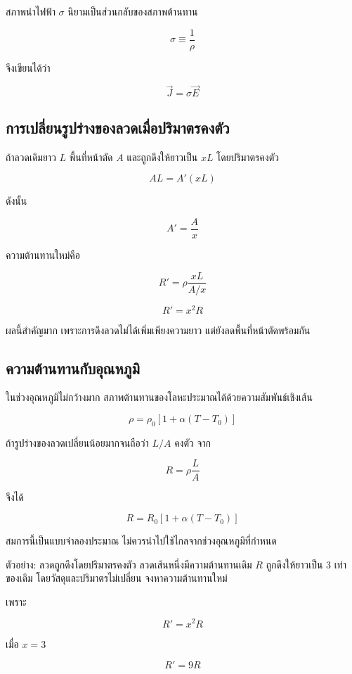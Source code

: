 สภาพนำไฟฟ้า $\sigma$ นิยามเป็นส่วนกลับของสภาพต้านทาน

\[
\boxed{\sigma\equiv\frac{1}{\rho}}
\]

จึงเขียนได้ว่า

\[
\vec{J}=\sigma\vec{E}
\]

\subsection{การเปลี่ยนรูปร่างของลวดเมื่อปริมาตรคงตัว}

ถ้าลวดเดิมยาว $L$ พื้นที่หน้าตัด $A$ และถูกดึงให้ยาวเป็น $xL$ โดยปริมาตรคงตัว

\[
AL=A'(xL)
\]

ดังนั้น

\[
A'=\frac{A}{x}
\]

ความต้านทานใหม่คือ

\[
R'=\rho\frac{xL}{A/x}
\]

\[
\boxed{R'=x^2R}
\]

ผลนี้สำคัญมาก เพราะการดึงลวดไม่ได้เพิ่มเพียงความยาว แต่ยังลดพื้นที่หน้าตัดพร้อมกัน

\subsection{ความต้านทานกับอุณหภูมิ}

ในช่วงอุณหภูมิไม่กว้างมาก สภาพต้านทานของโลหะประมาณได้ด้วยความสัมพันธ์เชิงเส้น

\[
\rho=\rho_0\left[1+\alpha(T-T_0)\right]
\]

ถ้ารูปร่างของลวดเปลี่ยนน้อยมากจนถือว่า $L/A$ คงตัว จาก

\[
R=\rho\frac{L}{A}
\]

จึงได้

\begin{tcolorbox}[title={ความต้านทานกับอุณหภูมิ}]
\[
\boxed{R=R_0\left[1+\alpha(T-T_0)\right]}
\]
\end{tcolorbox}

สมการนี้เป็นแบบจำลองประมาณ ไม่ควรนำไปใช้ไกลจากช่วงอุณหภูมิที่กำหนด

\begin{examplebox}{ตัวอย่าง: ลวดถูกดึงโดยปริมาตรคงตัว}
ลวดเส้นหนึ่งมีความต้านทานเดิม $R$ ถูกดึงให้ยาวเป็น $3$ เท่าของเดิม โดยวัสดุและปริมาตรไม่เปลี่ยน จงหาความต้านทานใหม่

เพราะ

\[
R'=x^2R
\]

เมื่อ $x=3$

\[
\boxed{R'=9R}
\]
\end{examplebox}

